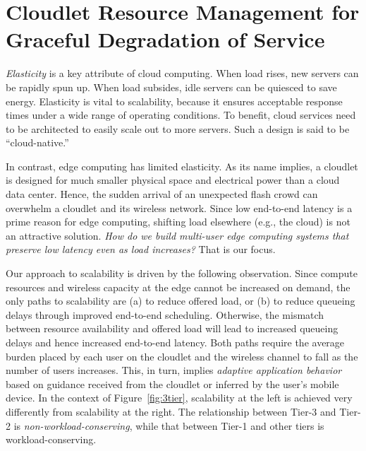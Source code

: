 \chapter{Cloudlet Resource Management for Graceful Degradation of Service}
\label{chapter: cloudlet}

{\em Elasticity} is a key attribute of cloud computing.  When load
rises, new servers can be rapidly spun up.  When load subsides, idle
servers can be quiesced to save energy.  Elasticity is vital to
scalability, because it ensures acceptable response times under a wide
range of operating conditions.  To benefit, cloud services need to be
architected to easily scale out to more servers.  Such a design is
said to be ``cloud-native.''

In contrast, edge computing has limited elasticity.  As its name
implies, a cloudlet is designed for much smaller physical space and
electrical power than a cloud data center.  Hence, the sudden arrival
of an unexpected flash crowd can overwhelm a cloudlet and its wireless
network.  Since low end-to-end latency is a prime reason for edge
computing, shifting load elsewhere (e.g., the cloud) is not an
attractive solution.  {\em How do we build multi-user edge computing
  systems that preserve low latency even as load increases?}  That is
our focus.


Our approach to scalability is driven by the following observation.
Since compute resources and wireless capacity at the edge cannot be
increased on demand, the only paths to scalability are (a) to reduce
offered load, or (b) to reduce queueing delays through improved
end-to-end scheduling.  Otherwise, the mismatch between resource
availability and offered load will lead to increased queueing delays
and hence increased end-to-end latency.  Both paths require the
average burden placed by each user on the cloudlet and the wireless
channel to fall as the number of users increases.  This, in turn,
implies {\em adaptive application behavior} based on guidance received
from the cloudlet or inferred by the user's mobile device.  In the
context of Figure~\ref{fig:3tier}, scalability at the left is achieved
very differently from scalability at the right.  The relationship
between Tier-3 and Tier-2 is {\em non-workload-conserving}, while that
between Tier-1 and other tiers is workload-conserving.

